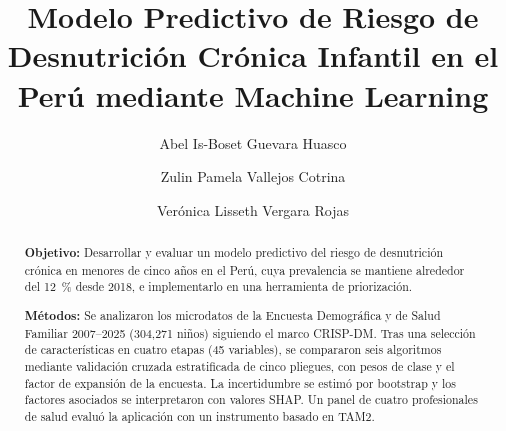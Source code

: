 \documentclass[final,5p,times,twocolumn,number,lefttitle]{elsarticle}
\begin{document}
\begin{frontmatter}



\title{Modelo Predictivo de Riesgo de Desnutrición Crónica Infantil en el Perú mediante Machine Learning}


\author[first]{Abel Is-Boset Guevara Huasco}
\author[first]{Zulin Pamela Vallejos Cotrina}
\author[first]{Verónica Lisseth Vergara Rojas}

\begin{abstract}
\textbf{Objetivo:} Desarrollar y evaluar un modelo predictivo del riesgo de desnutrición crónica en menores de cinco años en el Perú, cuya prevalencia se mantiene alrededor del 12~\% desde 2018, e implementarlo en una herramienta de priorización.

\textbf{Métodos:} Se analizaron los microdatos de la Encuesta Demográfica y de Salud Familiar 2007--2025 (304,271 niños) siguiendo el marco CRISP-DM. Tras una selección de características en cuatro etapas (45 variables), se compararon seis algoritmos mediante validación cruzada estratificada de cinco pliegues, con pesos de clase y el factor de expansión de la encuesta. La incertidumbre se estimó por bootstrap y los factores asociados se interpretaron con valores SHAP. Un panel de cuatro profesionales de salud evaluó la aplicación con un instrumento basado en TAM2.


\end{abstract}
\end{frontmatter}
\end{document}
